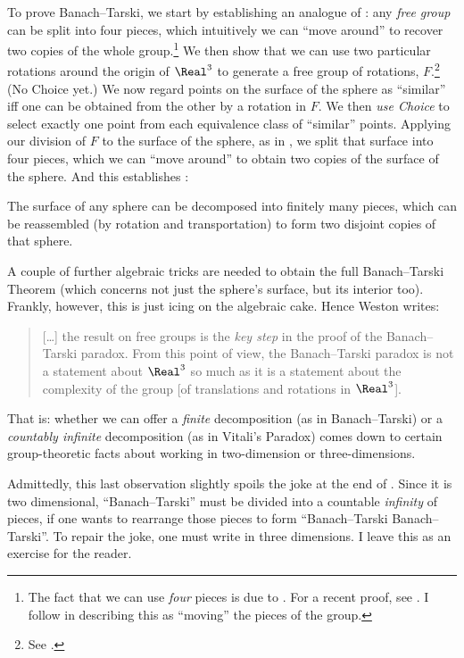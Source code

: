 \documentclass[../../../include/open-logic-section]{subfiles}
\begin{document}
To prove Banach--Tarski, we start by establishing an analogue of : any \emph{free group} can be split into four pieces, which intuitively we can ``move around'' to recover two copies of the whole group.\footnote{The fact that we can use \emph{four} pieces is due to \cite{Robinson1947}. For a recent proof, see \citet[Theorem 5.2]{Wagon2016}. I follow \citet[3]{WestonUnpublished} in describing this as ``moving'' the pieces of the group.} We then show that we can use two particular rotations around the origin of $\Real^3$ to generate a free group of rotations, $F$.\footnote{See \citet[Theorem 2.1]{Wagon2016}.} (No Choice yet.) We now regard points on the surface of the sphere as ``similar'' iff one can be obtained from the other by a rotation in $F$. We then \emph{use Choice} to select exactly one point from each equivalence class of ``similar'' points. Applying our division of $F$ to the surface of the sphere, as in , we split that surface into four pieces, which we can ``move around'' to obtain two copies of the surface of the sphere. And this establishes \citep{Hausdorff1914}:
\begin{thm}
	The surface of any sphere can be decomposed into finitely many pieces, which can be reassembled (by rotation and transportation) to form two disjoint copies of that sphere.
\end{thm}\noindent
A couple of further algebraic tricks are needed to obtain the full Banach--Tarski Theorem (which concerns not just the sphere's surface, but its interior too). Frankly, however, this is just icing on the algebraic cake. Hence Weston writes:
\begin{quote}	
	[\ldots] the result on free groups is the \emph{key step} in the proof of the Banach--Tarski paradox. From this point of view, the Banach--Tarski paradox is not a statement about $\Real^3$ so much as it is a statement about the complexity of the group [of translations and rotations in $\Real^3$]. \cite[16]{WestonUnpublished}
\end{quote}
That is: whether we can offer a \emph{finite} decomposition (as in Banach--Tarski) or a \emph{countably infinite} decomposition (as in Vitali's Paradox) comes down to certain group-theoretic facts about working in two-dimension or three-dimensions.

Admittedly, this last observation slightly spoils the joke at the end of . Since it is  two dimensional, ``Banach--Tarski'' must be divided into a countable \emph{infinity} of pieces, if one wants to rearrange those pieces to form ``Banach--Tarski Banach--Tarski''. To repair the joke, one must write in three dimensions. I leave this as an exercise for the reader.
\end{document}
